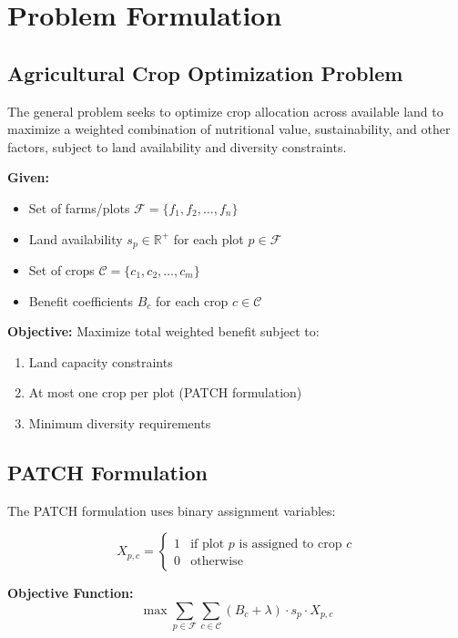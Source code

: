 \documentclass[11pt,a4paper]{article}
\begin{document}
\section{Problem Formulation}

\subsection{Agricultural Crop Optimization Problem}

The general problem seeks to optimize crop allocation across available land to maximize a weighted combination of nutritional value, sustainability, and other factors, subject to land availability and diversity constraints.

\textbf{Given:}
\begin{itemize}
    \item Set of farms/plots $\mathcal{F} = \{f_1, f_2, \ldots, f_n\}$
    \item Land availability $s_p \in \mathbb{R}^+$ for each plot $p \in \mathcal{F}$
    \item Set of crops $\mathcal{C} = \{c_1, c_2, \ldots, c_m\}$
    \item Benefit coefficients $B_c$ for each crop $c \in \mathcal{C}$
\end{itemize}

\textbf{Objective:} Maximize total weighted benefit subject to:
\begin{enumerate}
    \item Land capacity constraints
    \item At most one crop per plot (PATCH formulation)
    \item Minimum diversity requirements
\end{enumerate}

\subsection{PATCH Formulation}

The PATCH formulation uses binary assignment variables:

\begin{equation}
X_{p,c} = \begin{cases}
1 & \text{if plot } p \text{ is assigned to crop } c \\
0 & \text{otherwise}
\end{cases}
\end{equation}

\textbf{Objective Function:}
\begin{equation}
\max \sum_{p \in \mathcal{F}} \sum_{c \in \mathcal{C}} (B_c + \lambda) \cdot s_p \cdot X_{p,c}
\end{equation}
\end{document}
